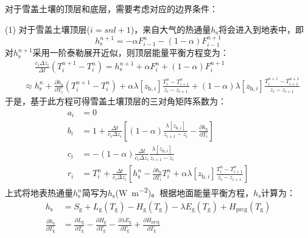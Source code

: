 对于雪盖土壤的顶层和底层，需要考虑对应的边界条件：

(1) 对于雪盖土壤顶层($i=snl+1$)，来自大气的热通量$h_{\mathrm {s}} $将会进入到地表中，即
\begin{equation}
  h_{\mathrm{s}}^{n+1}=-\alpha F_{i-1}^{n}-(1-\alpha) F_{i-1}^{n+1}
\end{equation}
对$h_{\mathrm {s}} ^{n+1}$采用一阶泰勒展开近似，则顶层能量平衡方程变为：
\begin{equation}
  \begin{split}
    &\mathrel{\phantom{\approx}}\frac{c_{i} \Delta z_{i}}{\Delta t}\left(T_{i}^{n+1}-T_{i}^{n}\right)=h_{\mathrm{s}}^{n+1}+\alpha F_{i}^{n}+(1-\alpha) F_{i}^{n+1} \\[1ex]
    &\approx h_{\mathrm{s}}^{n}+\frac{\partial h_{\mathrm{s}}}{\partial T_{i}}\left(T_{i}^{n+1}-T_{i}^{n}\right)+\alpha \lambda\left[z_{\mathrm{h},i}\right] \frac{T_{i}^{n}-T_{i+1}^{n}}{z_{i}-z_{i+1}}+(1-\alpha) \lambda\left[z_{\mathrm{h},i}\right] \frac{T_{i}^{n+1}-T_{i+1}^{n+1}}{z_{i}-z_{i+1}}
  \end{split}
\end{equation}
于是，基于此方程可得雪盖土壤顶层的三对角矩阵系数为：
\begin{equation}
  \begin{aligned}
    a_{i} &= 0 \\[1ex]
    b_{i} &= 1+\frac{\Delta t}{c_{i} \Delta z_{i}}\left[(1-\alpha) \frac{\lambda\left[z_{\mathrm{h},i}\right]}{z_{i+1}-z_{i}}-\frac{\partial h_{\mathrm{s}}}{\partial T_{i}}\right] \\[1ex]
    c_{i} &= -(1-\alpha) \frac{\Delta t}{c_{i} \Delta z_{i}} \frac{\lambda\left[z_{\mathrm{h},i}\right]}{z_{i+1}-z_{i}} \\[1ex]
    r_{i} &= T_{i}^{n}+\frac{\Delta t}{c_{i} \Delta z_{i}}\left[h_{\mathrm{s}}^{n}-\frac{\partial h_{\mathrm{s}}}{\partial T_{i}} T_{i}^{n}+\alpha \lambda\left[z_{\mathrm{h},i}\right] \frac{T_{i}^{n}-T_{i+1}^{n}}{z_{i}-z_{i+1}}\right]
  \end{aligned}
\end{equation}
上式将地表热通量$h_{\mathrm{s}}^n$简写为$h_{\mathrm{s}}$(\unit{W.m^{-2}})。根据地面能量平衡方程，$h_{\mathrm{s}}$计算为：
\begin{equation}
  \begin{aligned}
    h_{\mathrm{s}} &= S_{\mathrm{g}}+L_{\mathrm{g}}\left(T_{\mathrm{g}}\right)-H_{\mathrm{g}}\left(T_{\mathrm{g}}\right)-\lambda E_{\mathrm{g}}\left(T_{\mathrm{g}}\right)+H_{\mathrm{p r c g}}\left(T_{\mathrm{g}}\right) \\[1.5ex]
    \frac{\partial h_{\mathrm{s}}}{\partial T_{\mathrm{g}}} &= \frac{\partial L_{\mathrm{g}}}{\partial T_{\mathrm{g}}}-\frac{\partial H_{\mathrm{g}}}{\partial T_{\mathrm{g}}}-\frac{\partial \lambda E_{\mathrm{g}}}{\partial T_{\mathrm{g}}}+\frac{\partial H_{\mathrm{p r c g}}}{\partial T_{\mathrm{g}}}
  \end{aligned}
\end{equation}
